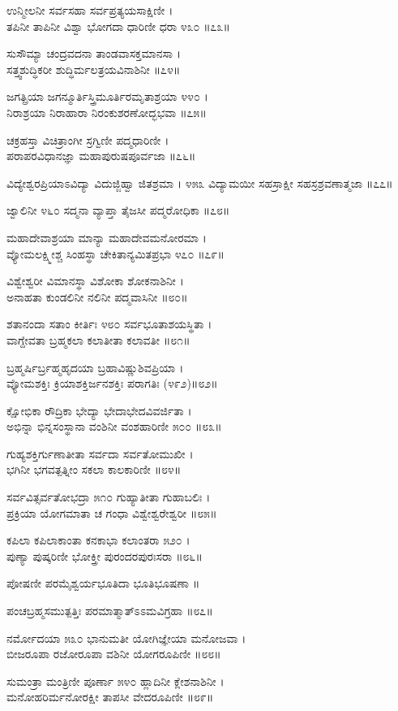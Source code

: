 ಉನ್ಮೀಲನೀ ಸರ್ವಸಹಾ ಸರ್ವಪ್ರತ್ಯಯಸಾಕ್ಷಿಣೀ ।\\
ತಪಿನೀ ತಾಪಿನೀ ವಿಶ್ವಾ ಭೋಗದಾ ಧಾರಿಣೀ ಧರಾ ೪೩೦ ॥೭೩॥

ಸುಸೌಮ್ಯಾ ಚಂದ್ರವದನಾ ತಾಂಡವಾಸಕ್ತಮಾನಸಾ ।\\
ಸತ್ತ್ವಶುದ್ಧಿಕರೀ ಶುದ್ಧಿರ್ಮಲತ್ರಯವಿನಾಶಿನೀ ॥೭೪॥

ಜಗತ್ಪ್ರಿಯಾ ಜಗನ್ಮೂರ್ತಿಸ್ತ್ರಿಮೂರ್ತಿರಮೃತಾಶ್ರಯಾ ೪೪೦ ।\\
ನಿರಾಶ್ರಯಾ ನಿರಾಹಾರಾ ನಿರಂಕುಶರಣೋದ್ಭಭವಾ ॥೭೫॥

ಚಕ್ರಹಸ್ತಾ ವಿಚಿತ್ರಾಂಗೀ ಸ್ರಗ್ವಿಣೀ ಪದ್ಮಧಾರಿಣೀ ।\\
ಪರಾಪರವಿಧಾನಜ್ಞಾ ಮಹಾಪುರುಷಪೂರ್ವಜಾ ॥೭೬॥

ವಿದ್ಯೇಶ್ವರಪ್ರಿಯಾಽವಿದ್ಯಾ ವಿದುಜ್ಜಿಹ್ವಾ ಜಿತಶ್ರಮಾ । ೪೫೩
ವಿದ್ಯಾಮಯೀ ಸಹಸ್ರಾಕ್ಷೀ ಸಹಸ್ರಶ್ರವಣಾತ್ಮಜಾ ॥೭೭॥

ಜ್ವಾಲಿನೀ ೪೬೦ ಸದ್ಮನಾ ವ್ಯಾಪ್ತಾ ತೈಜಸೀ ಪದ್ಮರೋಧಿಕಾ ॥೭೮॥

ಮಹಾದೇವಾಶ್ರಯಾ ಮಾನ್ಯಾ ಮಹಾದೇವಮನೋರಮಾ ।\\
ವ್ಯೋಮಲಕ್ಷ್ಮೀಶ್ಚ ಸಿಂಹಸ್ಥಾ ಚೇಕಿತಾನ್ಯಮಿತಪ್ರಭಾ ೪೭೦ ॥೭೯॥

ವಿಶ್ವೇಶ್ವರೀ ವಿಮಾನಸ್ಥಾ ವಿಶೋಕಾ ಶೋಕನಾಶಿನೀ ।\\
ಅನಾಹತಾ ಕುಂಡಲಿನೀ ನಲಿನೀ ಪದ್ಮವಾಸಿನೀ ॥೮೦॥

ಶತಾನಂದಾ ಸತಾಂ ಕೀರ್ತಿಃ ೪೮೦ ಸರ್ವಭೂತಾಶಯಸ್ಥಿತಾ ।\\
ವಾಗ್ದೇವತಾ ಬ್ರಹ್ಮಕಲಾ ಕಲಾತೀತಾ ಕಲಾವತೀ ॥೮೧॥

ಬ್ರಹ್ಮರ್ಷಿರ್ಬ್ರಹ್ಮಹೃದಯಾ ಬ್ರಹಾವಿಷ್ಣುಶಿವಪ್ರಿಯಾ ।\\
ವ್ಯೋಮಶಕ್ತಿಃ ಕ್ರಿಯಾಶಕ್ತಿರ್ಜನಶಕ್ತಿಃ ಪರಾಗತಿಃ (೪೯೨)॥೮೨॥

ಕ್ಷೋಭಿಕಾ ರೌದ್ರಿಕಾ ಭೇದ್ಯಾ ಭೇದಾಭೇದವಿವರ್ಜಿತಾ ।\\
ಅಭಿನ್ನಾ ಭಿನ್ನಸಂಸ್ಥಾನಾ ವಂಶಿನೀ ವಂಶಹಾರಿಣೀ ೫೦೦ ॥೮೩॥

ಗುಹ್ಯಶಕ್ತಿರ್ಗುಣಾತೀತಾ ಸರ್ವದಾ ಸರ್ವತೋಮುಖೀ ।\\
ಭಗಿನೀ ಭಗವತ್ಪತ್ನೀಂ ಸಕಲಾ ಕಾಲಕಾರಿಣೀ ॥೮೪॥

ಸರ್ವವಿತ್ಸರ್ವತೋಭದ್ರಾ ೫೧೦ ಗುಹ್ಯಾತೀತಾ ಗುಹಾಬಲಿಃ ।\\
ಪ್ರಕ್ರಿಯಾ ಯೋಗಮಾತಾ ಚ ಗಂಧಾ ವಿಶ್ವೇಶ್ವರೇಶ್ವರೀ ॥೮೫॥

ಕಪಿಲಾ ಕಪಿಲಾಕಾಂತಾ ಕನಕಾಭಾ ಕಲಾಂತರಾ ೫೨೦ ।\\
ಪುಣ್ಯಾ ಪುಷ್ಕರಿಣೀ ಭೋಕ್ತ್ರೀ ಪುರಂದರಪುರಃಸರಾ ॥೮೬॥

ಪೋಷಣೀ ಪರಮೈಶ್ವರ್ಯಭೂತಿದಾ ಭೂತಿಭೂಷಣಾ ॥

ಪಂಚಬ್ರಹ್ಮಸಮುತ್ಪತ್ತಿಃ ಪರಮಾತ್ಮಾತ್ಽಽಮವಿಗ್ರಹಾ ॥೮೭॥

ನರ್ಮೋದಯಾ ೫೩೦ ಭಾನುಮತೀ ಯೋಗಿಜ್ಞೇಯಾ ಮನೋಜವಾ ।\\
ಬೀಜರೂಪಾ ರಜೋರೂಪಾ ವಶಿನೀ ಯೋಗರೂಪಿಣೀ ॥೮೮॥

ಸುಮಂತ್ರಾ ಮಂತ್ರಿಣೀ ಪೂರ್ಣಾ ೫೪೦ ಹ್ಲಾದಿನೀ ಕ್ಲೇಶನಾಶಿನೀ ।\\
ಮನೋಹರಿರ್ಮನೋರಕ್ಷೀ ತಾಪಸೀ ವೇದರೂಪಿಣೀ ॥೮೯॥

